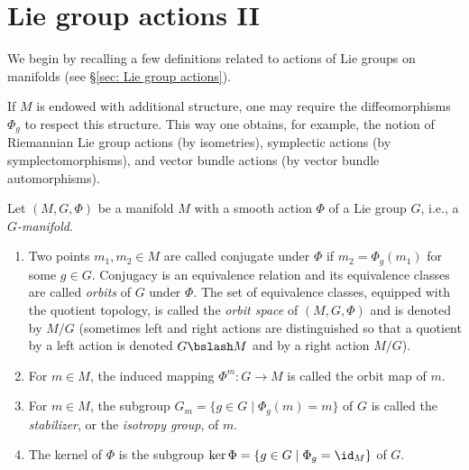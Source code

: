 






\section{Lie group actions II}

We begin by recalling a few definitions related to actions of Lie groups on manifolds (see \S\ref{sec: Lie group actions}).


\begin{rem}
    If $M$ is endowed with additional structure, one may require the diffeomorphisms $\Phi_g$ to respect this structure. This way one obtains, for example, the notion of Riemannian Lie group actions (by isometries), symplectic actions (by symplectomorphisms), and vector bundle actions (by vector bundle automorphisms).
\end{rem}


\begin{defn}
    Let $(M,G,\Phi)$ be a manifold $M$ with a smooth action $\Phi$ of a Lie group $G$, i.e., a \emph{$G$-manifold}. 
    \begin{enumerate}
        \item Two points $m_1,m_2\in M$ are called conjugate under $\Phi$ if $m_2=\Phi_g(m_1)$ for some $g\in G$. Conjugacy is an equivalence relation and its equivalence classes are called \emph{orbits} of $G$ under $\Phi$. The set of equivalence classes, equipped with the quotient topology, is called the \emph{orbit space} of $(M,G,\Phi)$ and is denoted by $M\slash G$ (sometimes left and right actions are distinguished so that a quotient by a left action is denoted $G\bslash M$ and by a right action $M\slash G$).
        \item For $m\in M$, the induced mapping $\Phi^m:G\to M$ is called the orbit map of $m$.
        \item For $m\in M$, the subgroup $G_m=\{g\in G\mid \Phi_g(m)=m\}$ of $G$ is called the \emph{stabilizer}, or the \emph{isotropy group}, of $m$.
        \item The kernel of $\Phi$ is the subgroup $\ker\Phi=\{g\in G\mid \Phi_g=\id_M\}$ of $G$.
    \end{enumerate}
\end{defn}

